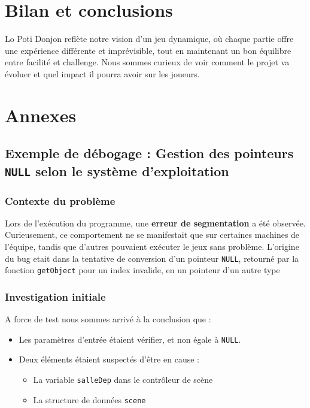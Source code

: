 \documentclass[a4paper,11pt]{article}
\begin{document}
\section{Bilan et conclusions}

Lo Poti Donjon reflète notre vision d'un jeu dynamique, où chaque partie offre une expérience différente et imprévisible, tout en maintenant un bon équilibre entre facilité et challenge. Nous sommes curieux de voir comment le projet va évoluer et quel impact il pourra avoir sur les joueurs.

\section{Annexes}

\subsection{Exemple de débogage : Gestion des pointeurs \texttt{NULL} selon le système d'exploitation}
\subsubsection{Contexte du problème}
Lors de l'exécution du programme, une \textbf{erreur de segmentation} a été observée. Curieusement, ce comportement ne se manifestait que sur certaines machines de l'équipe, tandis que d'autres pouvaient exécuter le jeux sans problème. 
L'origine du bug etait dans la tentative de conversion d'un pointeur \texttt{NULL}, retourné par la fonction \texttt{getObject} pour un index invalide, en un pointeur d'un autre type

\subsubsection{Investigation initiale}
A force de test nous sommes arrivé à la conclusion que :
\begin{itemize} 
    \item Les paramètres d'entrée étaient vérifier, et non égale à \texttt{NULL}. 
    \item Deux éléments étaient suspectés d'être en cause : 
    \begin{itemize} \item La variable \texttt{salleDep} dans le contrôleur de scène 
    \item La structure de données \texttt{scene} 
    \end{itemize} 
\end{itemize}
\end{document}
